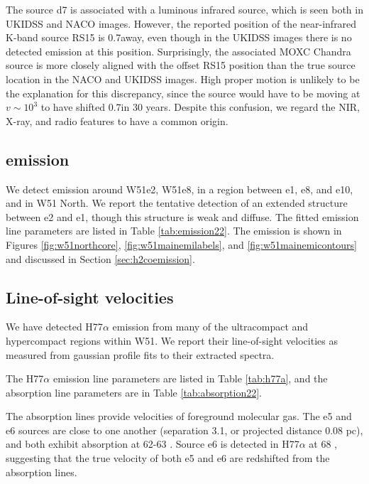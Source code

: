 The source d7 is associated with a luminous infrared source, which is
seen both in UKIDSS \citep{Lucas2008a} and NACO \citep{Figueredo2008a} images.
However, the reported position of the near-infrared K-band
\citet{Goldader1994a} source RS15 is
0.7\arcsec away, even though in the UKIDSS images there is no detected emission
at this position.  Surprisingly, the associated MOXC Chandra source
\citep{Townsley2014a} is more closely aligned with the offset RS15 position
than the true source location in the NACO and UKIDSS images.  High proper motion
is unlikely to be the explanation for this discrepancy, since the source
would have to be moving at $v\sim10^3$ \kms to have shifted 0.7\arcsec in 30
years.  Despite this confusion, we regard the NIR, X-ray, and radio features to
have a common
origin.


\subsection{\formaldehyde \twotwo emission}
\label{sec:twotwoemission}
We detect \formaldehyde \twotwo emission around W51e2, W51e8, in a region
between e1, e8, and e10, and in W51 North.  We report the tentative detection
of an extended structure between e2 and e1, though this structure is weak
and diffuse.  The fitted
emission line parameters are listed in Table \ref{tab:emission22}.  The
emission is shown in Figures \ref{fig:w51northcore},
\ref{fig:w51mainemilabels}, and \ref{fig:w51mainemicontours} and discussed in
Section \ref{sec:h2coemission}.



\subsection{Line-of-sight velocities}
\label{sec:LOSvelo}
We have detected H77$\alpha$ emission from many of the ultracompact and
hypercompact \hii regions within W51.  We report their line-of-sight velocities
as measured from gaussian profile fits to their extracted spectra.

The H77$\alpha$ emission line parameters are listed in Table \ref{tab:h77a}, and
the \para \twotwo absorption line parameters are in Table \ref{tab:absorption22}.

The \formaldehyde absorption lines provide velocities of foreground molecular
gas.  The e5 and e6 sources are close to one another (separation 3.1\arcsec,
or projected distance 0.08 pc), and both exhibit \formaldehyde absorption at
62-63 \kms.  Source e6 is detected in H77$\alpha$ at 68 \kms, suggesting that
the true velocity of both e5 and e6 are redshifted from the \formaldehyde
absorption lines. 

